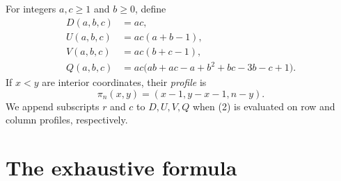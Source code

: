 \documentclass[11pt]{article}
\begin{document}
For integers $a,c\geq1$ and $b\geq0$, define
\begin{align*}
 D(a,b,c)&=ac,\\
 U(a,b,c)&=ac(a+b-1),\\
 V(a,b,c)&=ac(b+c-1),\\
 Q(a,b,c)&=ac\bigl(ab+ac-a+b^2+bc-3b-c+1\bigr).             \tag{2}
\end{align*}
If $x<y$ are interior coordinates, their \emph{profile} is
\[
       \pi_n(x,y)=(x-1,y-x-1,n-y).                           \tag{3}
\]
We append subscripts $r$ and $c$ to $D,U,V,Q$ when (2) is evaluated on
row and column profiles, respectively.

\section{The exhaustive formula}
\end{document}
